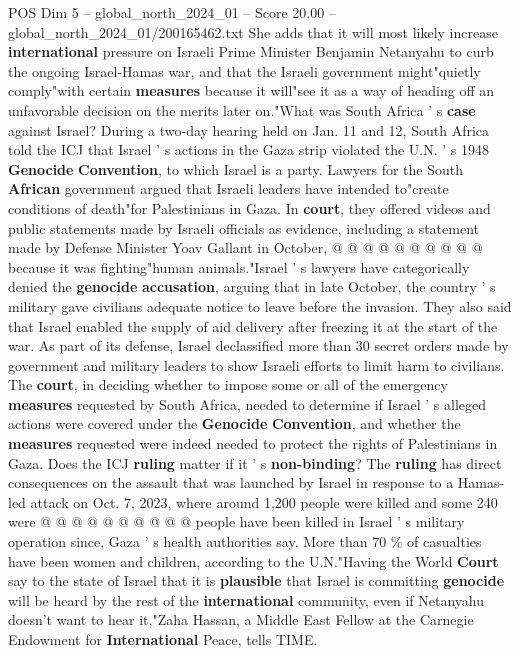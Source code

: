 \begin{textsample}{POS Dim 5 – global\_north\_2024\_01 – Score 20.00 – global\_north\_2024\_01/200165462.txt}
She adds that it will most likely increase \textbf{international} pressure on Israeli Prime Minister Benjamin Netanyahu to curb the ongoing Israel-Hamas war, and that the Israeli government might"quietly comply"with certain \textbf{measures} because it will"see it as a way of heading off an unfavorable decision on the merits later on."What was South Africa ' s \textbf{case} against Israel?
During a two-day hearing held on Jan. 11 and 12, South Africa told the ICJ that Israel ' s actions in the Gaza strip violated the U.N. ' s 1948 \textbf{Genocide} \textbf{Convention}, to which Israel is a party.
Lawyers for the South \textbf{African} government argued that Israeli leaders have intended to"create conditions of death"for Palestinians in Gaza.
In \textbf{court}, they offered videos and public statements made by Israeli officials as evidence, including a statement made by Defense Minister Yoav Gallant in October, @ @ @ @ @ @ @ @ @ @ because it was fighting"human animals."Israel ' s lawyers have categorically denied the \textbf{genocide} \textbf{accusation}, arguing that in late October, the country ' s military gave civilians adequate notice to leave before the invasion.
They also said that Israel enabled the supply of aid delivery after freezing it at the start of the war.
As part of its defense, Israel declassified more than 30 secret orders made by government and military leaders to show Israeli efforts to limit harm to civilians.
The \textbf{court}, in deciding whether to impose some or all of the emergency \textbf{measures} requested by South Africa, needed to determine if Israel ' s alleged actions were covered under the \textbf{Genocide} \textbf{Convention}, and whether the \textbf{measures} requested were indeed needed to protect the rights of Palestinians in Gaza.
Does the ICJ \textbf{ruling} matter if it ' s \textbf{non-binding}?
The \textbf{ruling} has direct consequences on the assault that was launched by Israel in response to a Hamas-led attack on Oct. 7, 2023, where around 1,200 people were killed and some 240 were @ @ @ @ @ @ @ @ @ @ people have been killed in Israel ' s military operation since, Gaza ' s health authorities say.
More than 70 \% of casualties have been women and children, according to the U.N."Having the World \textbf{Court} say to the state of Israel that it is \textbf{plausible} that Israel is committing \textbf{genocide} will be heard by the rest of the \textbf{international} community, even if Netanyahu doesn't want to hear it,"Zaha Hassan, a Middle East Fellow at the Carnegie Endowment for \textbf{International} Peace, tells TIME.

\end{textsample}
